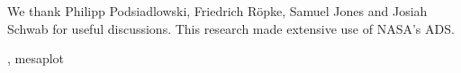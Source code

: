 \documentclass[twocolumn,tighten,times]{aastex62}
\begin{document}
\acknowledgments
We thank Philipp Podsiadlowski, Friedrich R\"{o}pke,  Samuel Jones and Josiah Schwab for useful discussions.
%
 This research made extensive use of NASA's ADS.

,
          mesaplot \citep{robert_farmer_2018_1441329}

 

\end{document}
